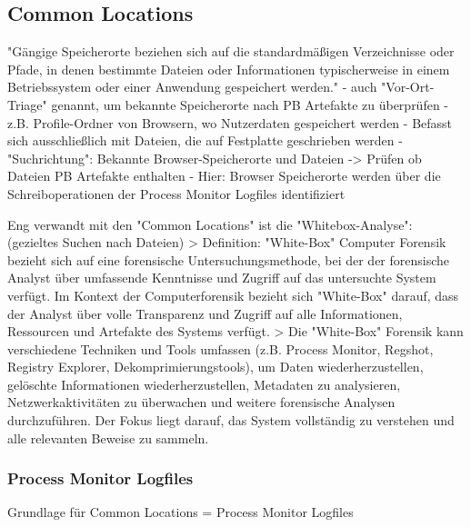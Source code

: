 \subsection{Common Locations}

"Gängige Speicherorte beziehen sich auf die standardmäßigen Verzeichnisse oder Pfade, in denen bestimmte Dateien oder Informationen typischerweise in einem Betriebssystem oder einer Anwendung gespeichert werden."	
- auch "Vor-Ort-Triage" \cite{Horsman.2019} genannt, um bekannte Speicherorte nach PB Artefakte zu überprüfen
- z.B. Profile-Ordner von Browsern, wo Nutzerdaten gespeichert werden
- Befasst sich ausschließlich mit Dateien, die auf Festplatte geschrieben werden
- "Suchrichtung": Bekannte Browser-Speicherorte und Dateien -> Prüfen ob Dateien PB Artefakte enthalten
- Hier: Browser Speicherorte werden über die Schreiboperationen der Process Monitor Logfiles identifiziert 

Eng verwandt mit den "Common Locations" ist die "Whitebox-Analyse": (gezieltes Suchen nach Dateien) \cite{Bonetti.2014}
> Definition: "White-Box" Computer Forensik bezieht sich auf eine forensische Untersuchungsmethode, bei der der forensische Analyst über umfassende Kenntnisse und Zugriff auf das untersuchte System verfügt. Im Kontext der Computerforensik bezieht sich "White-Box" darauf, dass der Analyst über volle Transparenz und Zugriff auf alle Informationen, Ressourcen und Artefakte des Systems verfügt.
> Die "White-Box" Forensik kann verschiedene Techniken und Tools umfassen (z.B. Process Monitor, Regshot, Registry Explorer, Dekomprimierungstools), um Daten wiederherzustellen, gelöschte Informationen wiederherzustellen, Metadaten zu analysieren, Netzwerkaktivitäten zu überwachen und weitere forensische Analysen durchzuführen. Der Fokus liegt darauf, das System vollständig zu verstehen und alle relevanten Beweise zu sammeln.

\subsubsection*{Process Monitor Logfiles}

Grundlage für Common Locations = Process Monitor Logfiles

